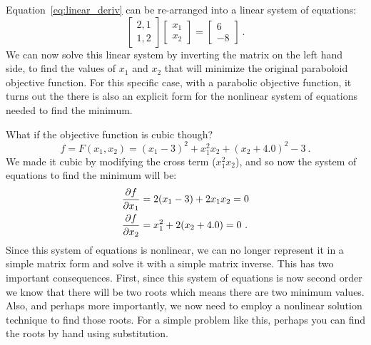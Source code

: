 \documentclass[conf]{new-aiaa}
\begin{document}
    Equation~\eqref{eq:linear_deriv} can be re-arranged into a linear system of equations: 
    \begin{equation}
        \begin{bmatrix}
        2,1 \\
        1,2
        \end{bmatrix} 
        \begin{bmatrix}
        x_1 \\ 
        x_2
        \end{bmatrix} = 
        \begin{bmatrix}
        6 \\ 
        -8
        \end{bmatrix} \ .
    \end{equation}
    We can now solve this linear system by inverting the matrix on the left hand side, to find the values of $x_1$ and $x_2$ that will minimize the original paraboloid objective function.
    For this specific case, with a parabolic objective function, it turns out the there is also an explicit form for the nonlinear system of equations needed to find the minimum. 

    What if the objective function is cubic though? 
    \begin{equation}
        f = F(x_1,x_2) = (x_1 - 3)^2 + x_1^2 x_2 + (x_2 + 4.0)^2 - 3 \ . 
    \end{equation}
    We made it cubic by modifying the cross term ($x_1^2 x_2$), and so now the system of equations to find the minimum will be: 
    \begin{align}
        \frac{\partial f}{\partial x_1} &= 2(x_1 - 3) + 2 x_1 x_2 = 0 \notag \\
        \frac{\partial f}{\partial x_2} &= x_1^2 + 2(x_2 + 4.0) = 0 \ .
    \end{align}
    Since this system of equations is nonlinear, we can no longer represent it in a simple matrix form and solve it with a simple matrix inverse. 
    This has two important consequences. 
    First, since this system of equations is now second order we know that there will be two roots which means there are two minimum values. 
    Also, and perhaps more importantly, we now need to employ a nonlinear solution technique to find those roots. 
    For a simple problem like this, perhaps you can find the roots by hand using substitution. 
\end{document}
